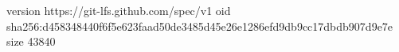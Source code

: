 version https://git-lfs.github.com/spec/v1
oid sha256:d458348440f6f5e623faad50de3485d45e26e1286efd9db9cc17dbdb907d9e7e
size 43840

